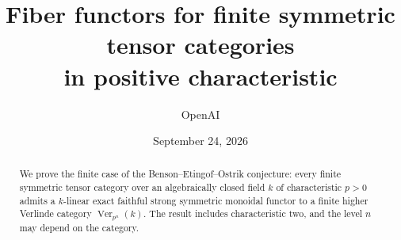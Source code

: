 \documentclass[11pt]{article}
\title{Fiber functors for finite symmetric tensor categories\\in positive characteristic}
\author{OpenAI}
\date{September 24, 2026}
\begin{document}
\maketitle
\begin{abstract}
We prove the finite case of the Benson--Etingof--Ostrik conjecture:
every finite symmetric tensor category over an algebraically closed field
$k$ of characteristic $p>0$ admits a $k$-linear exact faithful strong symmetric
monoidal functor to a finite higher Verlinde category
$\operatorname{Ver}_{p^n}(k)$. The result includes characteristic two,
and the level $n$ may depend on the category.
\end{abstract}
\setcounter{tocdepth}{1}
\tableofcontents
\clearpage










\end{document}
